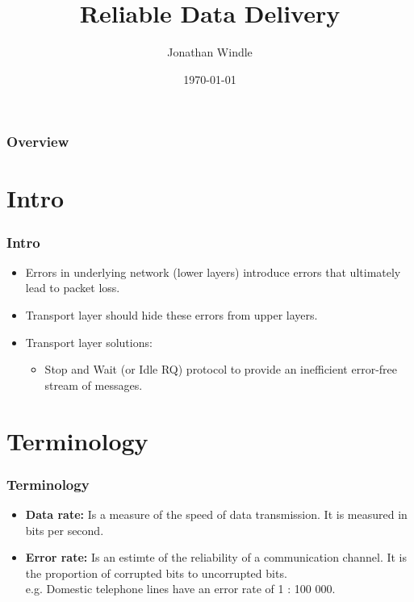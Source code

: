 \documentclass{beamer}
\title[Reliable Data Delivery]{Reliable Data Delivery} %
\author{Jonathan Windle} %
\institute[UEA] %
{
University of East Anglia \\ %
\medskip
\textit{J.Windle@uea.ac.uk} %
}
\date{\today} %
\begin{document}
\begin{frame}
\titlepage %
\end{frame}

\begin{frame}[allowframebreaks]
\frametitle{Overview} %
\tableofcontents %
\end{frame}

\section{Intro}
\begin{frame}
\frametitle{Intro}
\begin{itemize}
\item Errors in underlying network (lower layers) introduce errors that ultimately lead to packet loss.
\item Transport layer should hide these errors from upper layers.
\item Transport layer solutions:
\begin{itemize}
\item Stop and Wait (or Idle RQ) protocol to provide an inefficient error-free stream of messages.
\end{itemize}
\end{itemize}
\end{frame}
\section{Terminology}
\begin{frame}
\frametitle{Terminology}
\begin{itemize}
\item \textbf{Data rate:} Is a measure of the speed of data transmission. It is measured in bits per second.
\item \textbf{Error rate:} Is an estimte of the reliability of a communication channel. It is the proportion of corrupted bits to uncorrupted bits.\\
e.g. Domestic telephone lines have an error rate of 1 : 100 000.
\end{itemize}
\end{frame}
\end{document}
